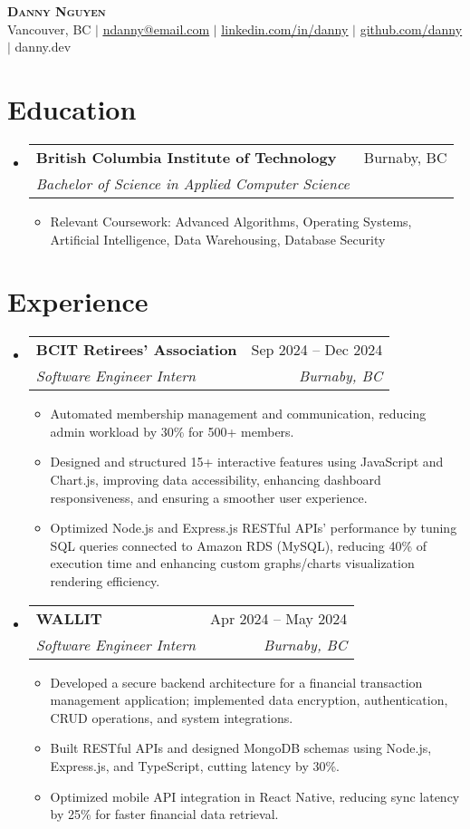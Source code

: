 \documentclass[letterpaper,11pt]{article}
\makeatletter
\newcommand{\resumeItem}[1]{
\item\small{
{#1 \vspace{-2pt}}
}
}
\newcommand{\resumeSubheading}[4]{
\vspace{-2pt}\item
\begin{tabular*}{0.97\textwidth}[t]{l@{\extracolsep{\fill}}r}
\textbf{#1} & #2 \\
\textit{\small#3} & \textit{\small #4} \\
\end{tabular*}\vspace{-7pt}
}
\newcommand{\resumeSubHeadingListStart}{\begin{itemize}[leftmargin=0.15in, label={}]}
\newcommand{\resumeSubHeadingListEnd}{\end{itemize}}
\newcommand{\resumeItemListStart}{\begin{itemize}}
\newcommand{\resumeItemListEnd}{\end{itemize}\vspace{-5pt}}
\makeatother
\begin{document}
\begin{center}
\textbf{\Huge \scshape Danny Nguyen} \\ \vspace{1pt}
\small Vancouver, BC $|$ \href{mailto:ndanny@email.com}{\underline{ndanny@email.com}} $|$
\href{https://linkedin.com/in/danny}{\underline{linkedin.com/in/danny}} $|$
\href{https://github.com/danny}{\underline{github.com/danny}} $|$ danny.dev
\end{center}


\section{Education}
\resumeSubHeadingListStart
\resumeSubheading{British Columbia Institute of Technology}{Burnaby, BC}{Bachelor of Science in Applied Computer Science}{ }
\resumeItemListStart
\resumeItem{Relevant Coursework: Advanced Algorithms, Operating Systems, Artificial Intelligence, Data Warehousing, Database Security}
\resumeItemListEnd
\resumeSubHeadingListEnd

\section{Experience}
\resumeSubHeadingListStart
\resumeSubheading{BCIT Retirees’ Association}{Sep 2024 – Dec 2024}{Software Engineer Intern}{Burnaby, BC}
\resumeItemListStart
\resumeItem{Automated membership management and communication, reducing admin workload by 30\% for 500+ members.}
\resumeItem{Designed and structured 15+ interactive features using JavaScript and Chart.js, improving data accessibility, enhancing dashboard responsiveness, and ensuring a smoother user experience.}
\resumeItem{Optimized Node.js and Express.js RESTful APIs’ performance by tuning SQL queries connected to Amazon RDS (MySQL), reducing 40\% of execution time and enhancing custom graphs/charts visualization rendering efficiency.}
\resumeItemListEnd

\resumeSubheading{WALLIT}{Apr 2024 – May 2024}{Software Engineer Intern}{Burnaby, BC}
\resumeItemListStart
\resumeItem{Developed a secure backend architecture for a financial transaction management application; implemented data encryption, authentication, CRUD operations, and system integrations.}
\resumeItem{Built RESTful APIs and designed MongoDB schemas using Node.js, Express.js, and TypeScript, cutting latency by 30\%.}
\resumeItem{Optimized mobile API integration in React Native, reducing sync latency by 25\% for faster financial data retrieval.}
\resumeItemListEnd
\resumeSubHeadingListEnd
\end{document}
